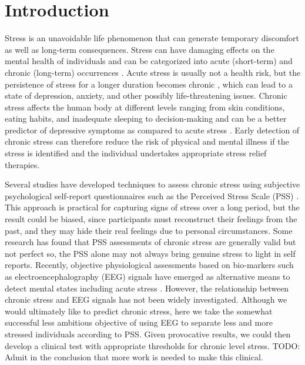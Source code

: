 \documentclass[pdflatex,sn-mathphys]{sn-jnl}%
\theoremstyle{thmstyleone}%
\theoremstyle{thmstyletwo}%
\theoremstyle{thmstylethree}%
\begin{document}


\maketitle
\section{Introduction} \label{sec1}
Stress is an unavoidable life phenomenon that can generate temporary discomfort as well as long-term consequences. Stress can have damaging effects on the mental health of individuals and can be categorized into acute (short-term) and chronic (long-term) occurrences \cite{Khosrowabadi-2011}. Acute stress is usually not a health risk, but the persistence of stress for a longer duration becomes chronic \cite{Khosrowabadi-2011}, which can lead to a state of depression, anxiety, and other possibly life-threatening issues. Chronic stress affects the human body at different levels ranging from skin conditions, eating habits, and inadequate sleeping to decision-making \cite{Thoits2010, Garg2001, Adam2007} and can be a better predictor of depressive symptoms as compared to acute stress \cite{McGonagle1990}. Early detection of chronic stress can therefore reduce the risk of physical and mental illness if the stress is identified and the individual undertakes appropriate stress relief therapies. 

Several studies have developed techniques to assess chronic stress using subjective psychological self-report questionnaires such as the Perceived Stress Scale (PSS) \cite{Cohen-1983}. This approach is practical for capturing signs of stress over a long period, but the result could be biased, since participants must reconstruct their feelings from the past, and they may hide their real feelings due to personal circumstances. Some research has found that PSS assessments of chronic stress are generally valid but not perfect \cite{Saeed2020} so, the PSS alone may not always bring genuine stress to light in self reports. Recently, objective physiological assessments based on bio-markers such as electroencephalography (EEG) signals have emerged as alternative means to detect mental states including acute stress \cite{Awang2011, Hu2015}. However, the relationship between chronic stress and EEG signals has not been widely investigated. Although we would ultimately like to predict chronic stress, here we take the somewhat successful less ambitious objective of using EEG to separate less and more stressed individuals according to PSS. Given provocative results, we could then develop a clinical test with appropriate thresholds for chronic level stress. TODO: Admit in the conclusion that more work is needed to make this clinical.
\end{document}
